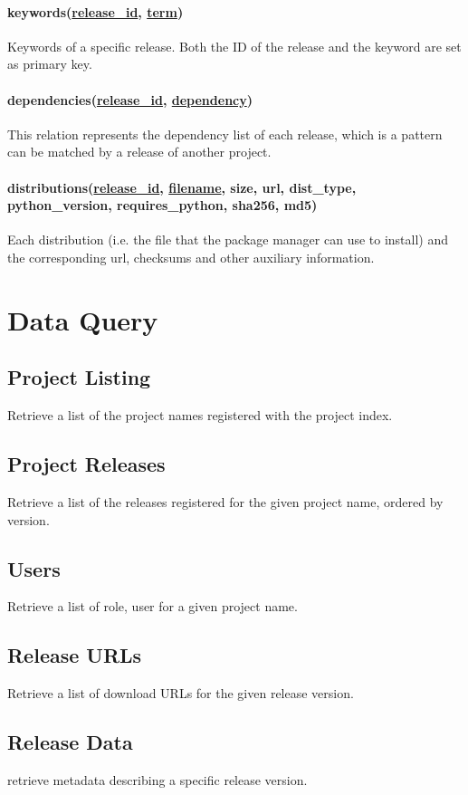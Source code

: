 \documentclass[a4paper,12pt]{article}
\newcommand{\id}[1]{\underline{#1\_id}}
\begin{document}
\paragraph{keywords(\id{release}, \underline{term})} Keywords of a specific
release.  Both the ID of the release and the keyword are set as primary key.

\paragraph{dependencies(\id{release}, \underline{dependency})} This relation
represents the dependency list of each release, which is a pattern can be
matched by a release of another project.

\paragraph{distributions(\id{release}, \underline{filename}, size, url,
dist\_type, python\_version, requires\_python, sha256, md5)}
Each distribution (i.e. the file that the package manager can use to install)
and the corresponding url, checksums and other auxiliary information.


\section{Data Query}
\subsection{Project Listing}
Retrieve a list of the project names registered with the project index.
\subsection{Project Releases}
Retrieve a list of the releases registered for the given project name, ordered by version.
\subsection{Users}
Retrieve a list of role, user for a given project name.
\subsection{Release URLs}
Retrieve a list of download URLs for the given release version.
\subsection{Release Data}
retrieve metadata describing a specific release version.
\end{document}
